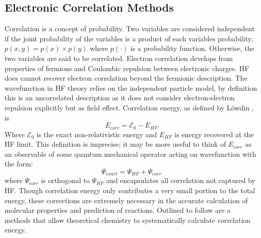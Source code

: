   \subsection{Electronic Correlation Methods}
    Correlation is a concept of probability. Two variables are considered independent if the joint probability of the variables is a product of each variables probability; $p(x,y) = p(x) \times p(y)$ where $p(\cdot)$ is a probability function.  Otherwise, the two variables are said to be correlated.\cite{Kutzelnigg2003}  Electron correlation develops from %
    properties of fermions and Coulombic repulsion between electronic charges. HF does cannot recover electron correlation beyond the fermionic description.  The wavefunction in HF theory relies on the independent particle model, by definition this is an uncorrelated description as it does not consider electron-electron repulsion explicitly but as %
    field effect. Correlation energy, as defined by L{\"o}wdin \cite{Lowdin1959}, is 
      \begin{equation} \label{corr_E}
      E_{corr} = \mathcal{E}_{0} - E_{HF}
      \end{equation}
    Where $\mathcal{E}_0$ is the exact non-relativistic energy and $E_{HF}$ is energy recovered at the HF limit.  This definition is imprecise; it may be more useful to think of $E_{corr}$ as an observable of some quantum mechanical operator acting on wavefunction with the form:
      \begin{equation}
      \Psi_{exact} = \Psi_{HF} + \Psi_{corr}
      \end{equation}
    where $\Psi_{corr}$ is orthogonal to $\Psi_{HF}$ and encapsulates all correlation not captured by HF.\cite{Kong2012}  Though correlation energy only contributes a very small portion to the total energy, these corrections are extremely necessary in the accurate calculation of molecular properties and prediction of reactions.  Outlined to follow are a methods that allow theoretical chemistry to systematically calculate correlation energy.
